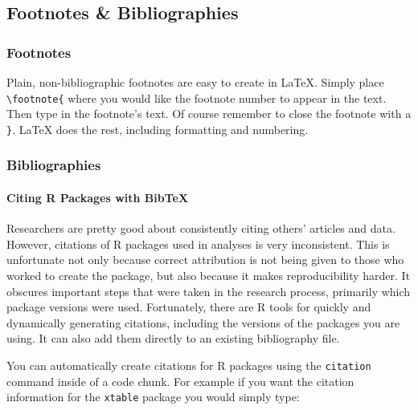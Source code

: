 \subsection{Footnotes \& Bibliographies}

\subsubsection{Footnotes}

Plain, non-bibliographic footnotes are easy to create in LaTeX. Simply place \texttt{\textbackslash{}footnote\{} where you would like the footnote number to appear in the text. Then type in the footnote's text. Of course remember to close the footnote with a \texttt{\}}. LaTeX does the rest, including formatting and numbering.

\subsubsection{Bibliographies}

\paragraph{Citing R Packages with BibTeX}

Researchers are pretty good about consistently citing others' articles and data. However, citations of R packages used in analyses is very inconsistent. This is unfortunate not only because correct attribution is not being given to those who worked to create the package, but also because it makes reproducibility harder. It obscures important steps that were taken in the research process, primarily which package versions were used. Fortunately, there are R tools for quickly and dynamically generating citations, including the versions of the packages you are using. It can also add them directly to an existing bibliography file.

You can automatically create citations for R packages using the \texttt{citation} command inside of a code chunk. For example if you want the citation information for the \texttt{xtable} package you would simply type:


